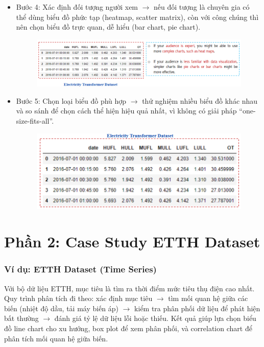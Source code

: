 \documentclass[11pt]{article}
\begin{document}
\begin{itemize}
    \item Bước 4: Xác định đối tượng người xem $\rightarrow$ nếu đối tượng là chuyên gia có thể dùng biểu đồ phức tạp (heatmap, scatter matrix), còn với công chúng thì nên chọn biểu đồ trực quan, dễ hiểu (bar chart, pie chart).
    \begin{figure}[H]
        \centering
        \includegraphics[width=1\linewidth]{images/rc4.png}
        \label{fig:rc4}
    \end{figure}

    \item Bước 5: Chọn loại biểu đồ phù hợp $\rightarrow$ thử nghiệm nhiều biểu đồ khác nhau và so sánh để chọn cách thể hiện hiệu quả nhất, vì không có giải pháp “one-size-fits-all”.
    \begin{figure}[H]
        \centering
        \includegraphics[width=1\linewidth]{images/rc5.png}
        \label{fig:rc5}
    \end{figure}

\end{itemize}


\section{Phần 2: Case Study ETTH Dataset}
\subsubsection*{Ví dụ: ETTH Dataset (Time Series)}
Với bộ dữ liệu ETTH, mục tiêu là tìm ra thời điểm mức tiêu thụ điện cao nhất. Quy trình phân tích đi theo: xác định mục tiêu $\rightarrow$ tìm mối quan hệ giữa các biến (nhiệt độ dầu, tải máy biến áp) $\rightarrow$ kiểm tra phân phối dữ liệu để phát hiện bất thường $\rightarrow$ đánh giá tỷ lệ dữ liệu lỗi hoặc thiếu. Kết quả giúp lựa chọn biểu đồ line chart cho xu hướng, box plot để xem phân phối, và correlation chart để phân tích mối quan hệ giữa biến.
\end{document}
